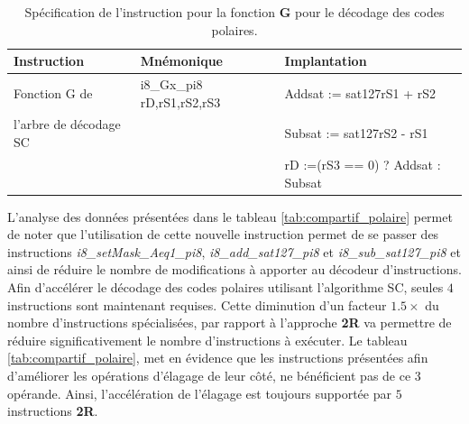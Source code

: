 \documentclass[../main.tex]{subfiles}
\begin{document}
  \begin{table}[!tb]
    \centering
    \footnotesize
      \begin{tabular}{l || l l }
      \hline
        \textbf{Instruction} & \textbf{Mnémonique}              & \textbf{Implantation} \\ 
        \hline                   
        Fonction G de           &i8\_Gx\_pi8 rD,rS1,rS2,rS3     & Addsat := sat127{rS1 + rS2} \\
        l'arbre de décodage SC  &                               & Subsat := sat127{rS2 - rS1} \\
                                &                               & rD \hspace{6mm} :=(rS3 == 0) ? Addsat : Subsat   \\
        \hline
      \end{tabular}
    \caption{Spécification de l'instruction pour la fonction \textbf{G} pour le décodage des codes polaires.}
    \label{tab:instrus_polar_3reg}
    \end{table}
L'analyse des données présentées dans le tableau \ref{tab:compartif_polaire} permet de noter que l'utilisation de cette nouvelle instruction permet de se passer des instructions \textit{i8\_setMask\_Aeq1\_pi8}, \textit{i8\_add\_sat127\_pi8} et \textit{i8\_sub\_sat127\_pi8} et ainsi de réduire le nombre de modifications à apporter au décodeur d'instructions.
Afin d'accélérer le décodage des codes polaires utilisant l'algorithme SC, seules $4$ instructions sont maintenant requises.
Cette diminution d'un facteur $1.5\times$ du nombre d'instructions spécialisées, par rapport à l'approche \textbf{2R} va permettre de réduire significativement le nombre d'instructions à exécuter.
Le tableau \ref{tab:compartif_polaire}, met en évidence que les instructions présentées afin d'améliorer les opérations d'élagage de leur côté, ne bénéficient pas de ce 3 opérande. Ainsi, l'accélération de l'élagage est toujours supportée par $5$ instructions \textbf{2R}.
\end{document}

